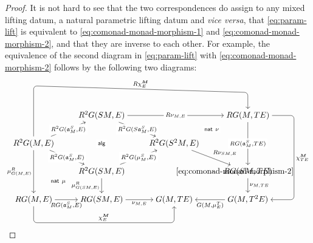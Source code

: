 \documentclass[12pt,dvipsnames,oneside]{amsart}
\theoremstyle{plain}
\theoremstyle{remark}
\theoremstyle{definition}
\newcommand{\act}{\mathfrak{a}}
\newcommand{\G}{G}
\begin{document}
\begin{proof}
  It is not hard to see that the two correspondences do assign to any mixed lifting datum, a natural parametric lifting datum and \emph{vice versa},
  that \eqref{eq:param-lift} is equivalent to \eqref{eq:comonad-monad-morphism-1} and \eqref{eq:comonad-monad-morphism-2},
  and that they are inverse to each other.
  For example, the equivalence of the second diagram in \eqref{eq:param-lift} with \eqref{eq:comonad-monad-morphism-2} follows by the following two diagrams:
  \[
    \begin{tikzcd}[ampersand replacement=\&,cramped]
      \& {R^2\G(SM,E)} \&\& {R\G(M,TE)} \\
      {R^2\G(M,E)} \&\& {R^2\G(S^2M,E)} \\
      \& {R^2\G(SM,E)} \&\& {R\G(SM,TE)} \\
      {R\G(M,E)} \& {R\G(SM,E)} \& {\G(M,TE)} \& {\G(M,T^2E)}
      \arrow["{R\nu_{M,E}}"{description}, from=1-2, to=1-4]
      \arrow["{R^2\G(S\act^S_M,E)}"{description}, from=1-2, to=2-3]
      \arrow["{R\G(\act^S_M,TE)}"{description}, from=1-4, to=3-4]
      \arrow["{R^2\G(\act^S_M,E)}"{description}, from=2-1, to=1-2]
      \arrow["{R^2\G(\act^S_M,E)}"{description}, from=2-1, to=3-2]
      \arrow["{\mu^R_{\G(M,E)}}"', from=2-1, to=4-1]
      \arrow["{R\nu_{SM,E}}", from=2-3, to=3-4]
      \arrow["{R^2\G(\mu^S_M,E)}"{description}, from=3-2, to=2-3]
      \arrow["{\mu^R_{\G(SM,E)}}"', from=3-2, to=4-2]
      \arrow["{\nu_{M,TE}}", from=3-4, to=4-4]
      \arrow["{R\G(\act^S_M,E)}"', from=4-1, to=4-2]
      \arrow["{\nu_{M,E}}"', from=4-2, to=4-3]
      \arrow["{\G(M,\mu^T_E)}", from=4-4, to=4-3]
      \arrow["\mathsf{alg}"{description}, draw=none, from=2-1, to=2-3]
      \arrow["\mathsf{nat}\ \nu"{description}, draw=none, from=2-3, to=1-4]
      \arrow["\mathsf{nat}\ \mu", draw=none, from=4-1, to=3-2]
      \arrow["{\eqref{eq:comonad-monad-morphism-2}}", draw=none, from=2-3, to=4-3]
      \arrow["{R\chi^{\boldsymbol{M}}_E}", from=2-1, to=1-4, rounded corners,
      to path={-- ([yshift=2.5cm]\tikztostart.center) -- ([yshift=1cm]\tikztotarget.center) \tikztonodes -- (\tikztotarget.north)}]
      \arrow["{\chi^{\boldsymbol{M}}_{TE}}", from=1-4, to=4-4, rounded corners,
      to path={-- ([xshift=2cm]\tikztostart.center) -- ([xshift=2cm]\tikztotarget.center) \tikztonodes -- (\tikztotarget.east)}]
      \arrow["{\chi^{\boldsymbol{M}}_{E}}", from=4-1, to=4-3, rounded corners,
      to path={-- ([yshift=-1cm]\tikztostart.center) -- ([yshift=-1cm]\tikztotarget.center) \tikztonodes -- (\tikztotarget.south)}]

\end{tikzcd}\]
\end{proof}
\end{document}
